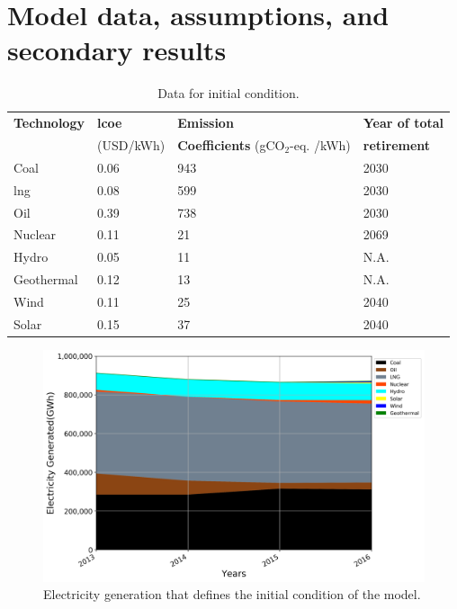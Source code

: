 \section{Model data, assumptions, and secondary results} \label{Appendix}

\begin{table}[H]
	\caption{Data for initial condition.}
	\vspace{0.1in}
	\begin{tabularx}{1.2\textwidth}{p{} p{} p{} p{}}
		\hline
\textbf{Technology} & \textbf{\gls{lcoe}} \cite{lazard_lazards_2016} & \textbf{Emission} & \textbf{Year of total}\\
  & (USD/kWh) & \textbf{Coefficients} \cite{noauthor_electricity_2019} (gCO$_2$-eq. /kWh) & \textbf{retirement} \\
\hline
Coal & 0.06 & 943 & 2030 \\
\gls{lng} & 0.08 & 599 & 2030 \\
Oil & 0.39 & 738 & 2030 \\
Nuclear & 0.11 & 21 & 2069 \\
Hydro & 0.05 & 11 & N.A. \\
Geothermal & 0.12 & 13 & N.A. \\
Wind & 0.11 & 25 & 2040 \\
Solar & 0.15 & 37 & 2040 \\
\hline 
\end{tabularx}
\label{init-eco}
\end{table}

\begin{figure}[h] 
\centering
\label{ic-elc}
\includegraphics[scale=0.5]{figures/IC}
\caption{Electricity generation that defines the initial condition of the model.}
\end{figure}

